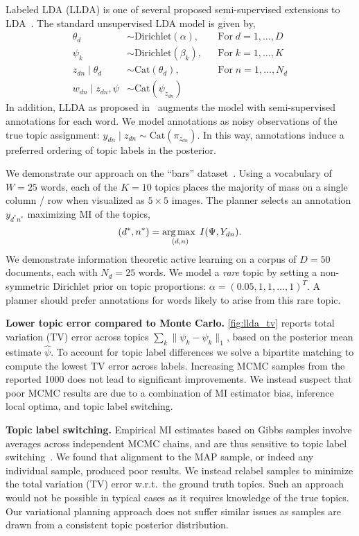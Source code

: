 Labeled LDA (LLDA) is one of several proposed semi-supervised
extensions to LDA~\citep{blei2003latent}.  The standard unsupervised
LDA model is given by,
\begin{align*}
  \theta_d &\sim \text{Dirichlet}(\alpha), &&\text{For}\; d=1,\ldots,D \\
  \psi_k &\sim \text{Dirichlet}(\beta_k), &&\text{For}\; k=1,\ldots,K \\
  z_{dn} \mid \theta_d &\sim \text{Cat}(\theta_d), &&\text{For}\;
    n=1,\ldots,N_d \\
  w_{dn} \mid z_{dn}, \psi &\sim \text{Cat}(\psi_{z_{dn}}) &&
\end{align*}
In addition, LLDA as proposed in~\cite{flaherty2005latent} augments
the model with semi-supervised annotations for each word.  We model
annotations as noisy observations of the true topic assignment:
$y_{dn} \mid z_{dn} \sim \text{Cat}(\pi_{z_{dn}})$.  In this way,
annotations induce a preferred ordering of topic labels in the posterior.

We demonstrate our approach on the ``bars''
dataset~\citep{griffiths2004finding}.  Using a vocabulary of $W=25$
words, each of the $K=10$ topics places the majority of mass on a
single column / row when visualized as $5\times 5$ images. The planner
selects an annotation $y_{d^*n^*}$ maximizing MI of the
topics,
\begin{equation}
  (d^*,n^*) = \operatorname*{arg\,max\;}_{(d,n)} I(\Psi, Y_{dn}).
\end{equation}
We demonstrate information theoretic active learning on a corpus of
$D=50$ documents, each with $N_d=25$ words.  We model a \emph{rare}
topic by setting a non-symmetric Dirichlet prior on topic proportions:
$\alpha = (0.05, 1, 1, \ldots, 1)^T$.  A planner should prefer
annotations for words likely to arise from this rare topic.

\textbf{Lower topic error compared to Monte Carlo.}
\FIG\ref{fig:llda_tv} reports total variation (TV) error across topics
$\sum_k \|\psi_k - \hat{\psi}_k\|_1$, based on the posterior mean
estimate $\hat{\psi}$.  To account for topic label differences we
solve a bipartite matching to compute the lowest TV error across
labels.  Increasing MCMC samples from the reported 1000 does not lead
to significant improvements.  We instead suspect that poor MCMC
results are due to a combination of MI estimator bias, inference local
optima, and topic label switching.

\textbf{Topic label switching.}
Empirical MI estimates based on Gibbs samples involve averages across
independent MCMC chains, and are thus sensitive to topic label
switching~\citep{stephens2000dealing}.  We found that alignment to the
MAP sample, or indeed any individual sample, produced poor results.
We instead relabel samples to minimize the total variation (TV) error
w.r.t.~the ground truth topics.  Such an approach would not be
possible in typical cases as it requires knowledge of the true topics.
Our variational planning approach does not suffer similar issues as
samples are drawn from a consistent topic posterior distribution.

